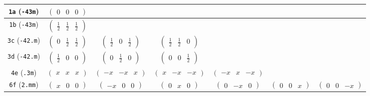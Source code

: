 \documentclass[fleqn,9pt,landscape]{jsarticle}
\begin{document}
\begin{center}
\begin{longtable}{ccccccc}
{\tt 1a} ({\tt -43m}) & $ \begin{pmatrix} 0 & 0 & 0 \end{pmatrix} $ & $  $ & $  $ & $  $ & $  $ & $  $ \\ \hline
{\tt 1b} ({\tt -43m}) & $ \begin{pmatrix} \frac{1}{2} & \frac{1}{2} & \frac{1}{2} \end{pmatrix} $ & $  $ & $  $ & $  $ & $  $ & $  $ \\ \hline
{\tt 3c} ({\tt -42.m}) & $ \begin{pmatrix} 0 & \frac{1}{2} & \frac{1}{2} \end{pmatrix} $ & $ \begin{pmatrix} \frac{1}{2} & 0 & \frac{1}{2} \end{pmatrix} $ & $ \begin{pmatrix} \frac{1}{2} & \frac{1}{2} & 0 \end{pmatrix} $ & $  $ & $  $ & $  $ \\ \hline
{\tt 3d} ({\tt -42.m}) & $ \begin{pmatrix} \frac{1}{2} & 0 & 0 \end{pmatrix} $ & $ \begin{pmatrix} 0 & \frac{1}{2} & 0 \end{pmatrix} $ & $ \begin{pmatrix} 0 & 0 & \frac{1}{2} \end{pmatrix} $ & $  $ & $  $ & $  $ \\ \hline
{\tt 4e} ({\tt .3m}) & $ \begin{pmatrix} x & x & x \end{pmatrix} $ & $ \begin{pmatrix} - x & - x & x \end{pmatrix} $ & $ \begin{pmatrix} x & - x & - x \end{pmatrix} $ & $ \begin{pmatrix} - x & x & - x \end{pmatrix} $ & $  $ & $  $ \\ \hline
{\tt 6f} ({\tt 2.mm}) & $ \begin{pmatrix} x & 0 & 0 \end{pmatrix} $ & $ \begin{pmatrix} - x & 0 & 0 \end{pmatrix} $ & $ \begin{pmatrix} 0 & x & 0 \end{pmatrix} $ & $ \begin{pmatrix} 0 & - x & 0 \end{pmatrix} $ & $ \begin{pmatrix} 0 & 0 & x \end{pmatrix} $ & $ \begin{pmatrix} 0 & 0 & - x \end{pmatrix} $ \\ \hline

\end{longtable}
\end{center}
\end{document}
